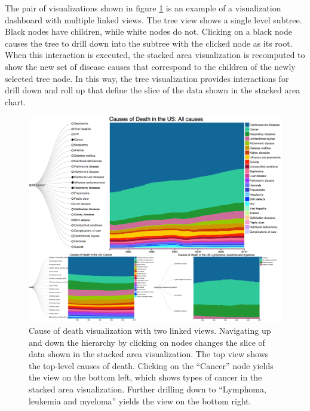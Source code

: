 \documentclass[12pt]{article}
\begin{document}
\begin{doublespace}
The pair of visualizations shown in figure \ref{fig:mortalityVisV4} is an example of a visualization dashboard with multiple linked views. The tree view shows a single level subtree. Black nodes have children, while white nodes do not. Clicking on a black node causes the tree to drill down into the subtree with the clicked node as its root. When this interaction is executed, the stacked area visualization is recomputed to show the new set of disease causes that correspond to the children of the newly selected tree node. In this way, the tree visualization provides interactions for drill down and roll up that define the slice of the data shown in the stacked area chart.

\begin{figure}[h!]
  \centering
  \includegraphics[width=\textwidth]{figures/mortalityVisV4.png}
  \caption[CDC Mortality Visualization with linked views.]
   {Cause of death visualization with two linked views. Navigating up and down the hierarchy by clicking on nodes changes the slice of data shown in the stacked area visualization. The top view shows the top-level causes of death. Clicking on the ``Cancer'' node yields the view on the bottom left, which shows types of cancer in the stacked area visualization. Further drilling down to ``Lymphoma, leukemia and myeloma'' yields the view on the bottom right.}
  \label{fig:mortalityVisV4}
\end{figure}


\end{doublespace}
\end{document}
